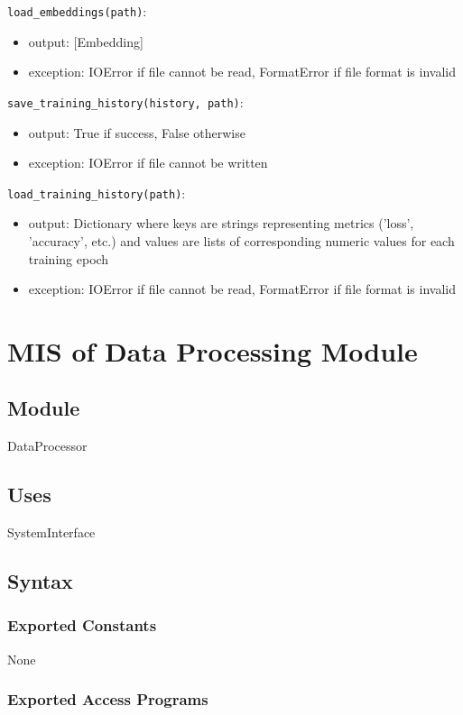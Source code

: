 \documentclass[12pt, titlepage]{article}
\begin{document}
\noindent \texttt{load\_embeddings(path)}:
\begin{itemize}
\item output: [Embedding]
\item exception: IOError if file cannot be read, FormatError if file format is invalid
\end{itemize}

\noindent \texttt{save\_training\_history(history, path)}:
\begin{itemize}
\item output: True if success, False otherwise
\item exception: IOError if file cannot be written
\end{itemize}

\noindent \texttt{load\_training\_history(path)}:
\begin{itemize}
\item output: Dictionary where keys are strings representing metrics ('loss', 'accuracy', etc.) and values are lists of corresponding numeric values for each training epoch
\item exception: IOError if file cannot be read, FormatError if file format is invalid
\end{itemize}

\newpage

\section{MIS of Data Processing Module} \label{ModuleDP}

\subsection{Module}

DataProcessor

\subsection{Uses}
SystemInterface

\subsection{Syntax}

\subsubsection{Exported Constants}
None
\subsubsection{Exported Access Programs}
\end{document}
